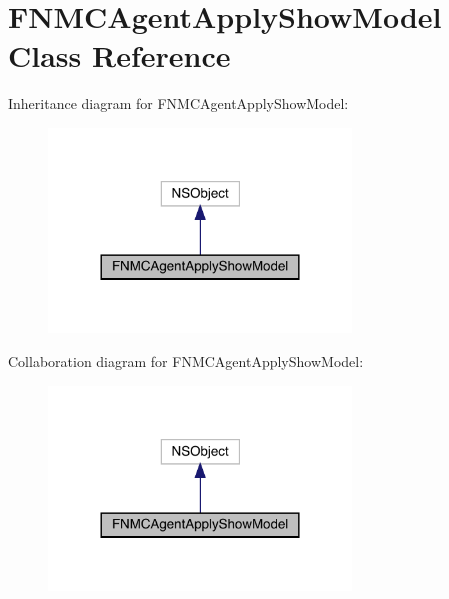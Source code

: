 \hypertarget{interface_f_n_m_c_agent_apply_show_model}{}\section{F\+N\+M\+C\+Agent\+Apply\+Show\+Model Class Reference}
\label{interface_f_n_m_c_agent_apply_show_model}


Inheritance diagram for F\+N\+M\+C\+Agent\+Apply\+Show\+Model\+:\nopagebreak
\begin{figure}[H]
\begin{center}
\leavevmode
\includegraphics[width=228pt]{interface_f_n_m_c_agent_apply_show_model__inherit__graph}
\end{center}
\end{figure}


Collaboration diagram for F\+N\+M\+C\+Agent\+Apply\+Show\+Model\+:\nopagebreak
\begin{figure}[H]
\begin{center}
\leavevmode
\includegraphics[width=228pt]{interface_f_n_m_c_agent_apply_show_model__coll__graph}
\end{center}
\end{figure}
